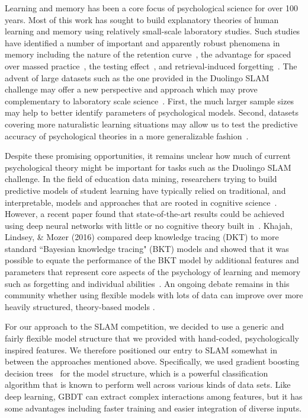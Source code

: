 \documentclass[11pt,a4paper]{article}
\begin{document}
Learning and memory has been a core focus of psychological science for
over 100 years. Most of this work has sought to build explanatory theories of human learning
and memory using relatively small-scale laboratory studies.  Such studies have
identified a number of important and apparently robust phenomena in memory including
the nature of the retention curve~\cite{Rubin:1996aa}, the advantage for spaced over massed 
practice~\cite{Ruth:1928aa,Cepeda:2006aa,Mozer:2009cs}, the testing effect~\cite{Roediger2006te},
and retrieval-induced forgetting~\cite{Anderson1994rif}.
The advent of large datasets such as the one provided in the Duolingo SLAM challenge
may offer a new perspective and approach which may prove complementary
to laboratory scale science~\cite{Griffiths:2015aa,Goldstone:2016aa}.  First, the much
larger sample sizes may help to better identify parameters of psychological models.
Second, datasets covering more naturalistic learning situations may allow us to test 
the predictive accuracy of psychological theories in a more generalizable fashion~\cite{Yarkoni:2017aa}.

Despite these promising opportunities, it remains unclear how much of current psychological
theory might be important for tasks such as the Duolingo SLAM challenge.
In the field of education data mining, researchers trying to build
predictive models of student learning have typically relied on traditional, and interpretable, models and approaches
that are rooted in cognitive science~\cite[e.g.,][]{Atkinson:1972rm,Atkinson:1972rz,Corbett1995bkt,Pavlik:2008rm}.
However, a recent paper found that state-of-the-art results could be achieved using deep neural networks with
little or no cognitive theory built in~\cite[so called ``deep knowledge tracing",][]{Piech:2015aa}.
Khajah, Lindsey, \& Mozer (2016) compared deep knowledge tracing (DKT) to more
standard ``Bayesian knowledge tracing" (BKT) models and showed
that it was possible to equate the performance of the BKT model by additional 
features and parameters that represent core aspects of the psychology of learning
and memory such as forgetting and individual abilities~\cite{Khajah2016hdnt}. An ongoing debate remains in this community 
whether using flexible models with lots of data can improve over more heavily structured, theory-based models \cite{Tang:2016:DNN, xiong2016going, zhang2017incorporating}.

For our approach to the SLAM competition, we decided to use a generic and fairly flexible model structure that we provided with hand-coded, psychologically inspired features.
We therefore positioned our entry to SLAM somewhat in between the approaches mentioned above.
Specifically, we used gradient boosting decision trees~\cite[GBDT,][]{ke2017lightgbm} for the model structure, which is a powerful classification algorithm that is known to perform well across various kinds of data sets.  Like
deep learning, GBDT can extract complex interactions among features,
but it has some advantages including faster training and easier integration of
diverse inputs. 
\end{document}
